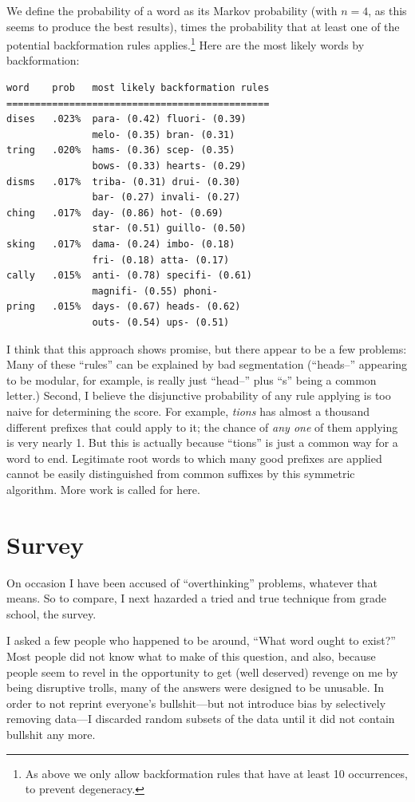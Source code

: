 \documentclass[twocolumn]{article}
\begin{document}
We define the probability of a word as its Markov probability (with
$n=4$, as this seems to produce the best results), times the
probability that at least one of the potential backformation rules
applies.\!\footnote{As above we only allow backformation rules that
  have at least 10 occurrences, to prevent degeneracy.} Here are the
most likely words by backformation:

\begin{verbatim}
word    prob   most likely backformation rules
==============================================
dises   .023%  para- (0.42) fluori- (0.39) 
               melo- (0.35) bran- (0.31)  
tring   .020%  hams- (0.36) scep- (0.35) 
               bows- (0.33) hearts- (0.29)  
disms   .017%  triba- (0.31) drui- (0.30) 
               bar- (0.27) invali- (0.27)  
ching   .017%  day- (0.86) hot- (0.69) 
               star- (0.51) guillo- (0.50)    
sking   .017%  dama- (0.24) imbo- (0.18) 
               fri- (0.18) atta- (0.17)     
cally   .015%  anti- (0.78) specifi- (0.61)
               magnifi- (0.55) phoni-    
pring   .015%  days- (0.67) heads- (0.62)
               outs- (0.54) ups- (0.51)    
\end{verbatim}

I think that this approach shows promise, but there appear to be a few
problems: Many of these ``rules'' can be explained by bad segmentation
(``heads--'' appearing to be modular, for example, is really just
``head--'' plus ``s'' being a common letter.) Second, I believe the
disjunctive probability of any rule applying is too naive for
determining the score. For example, {\it tions} has almost a thousand
different prefixes that could apply to it; the chance of {\it any one}
of them applying is very nearly 1. But this is actually because ``tions''
is just a common way for a word to end. Legitimate root words to which
many good prefixes are applied cannot be easily distinguished from
common suffixes by this symmetric algorithm. More work is called for
here.

\section{Survey}

On occasion I have been accused of ``overthinking'' problems, whatever
that means. So to compare, I next hazarded a tried and true technique
from grade school, the survey.

I asked a few people who happened to be around, ``What word ought to
exist?'' Most people did not know what to make of this question, and
also, because people seem to revel in the opportunity to get (well
deserved) revenge on me by being disruptive trolls, many of the
answers were designed to be unusable. In order to not reprint
everyone's bullshit---but not introduce bias by selectively removing
data---I discarded random subsets of the data until it did not contain
bullshit any more.
\end{document}
